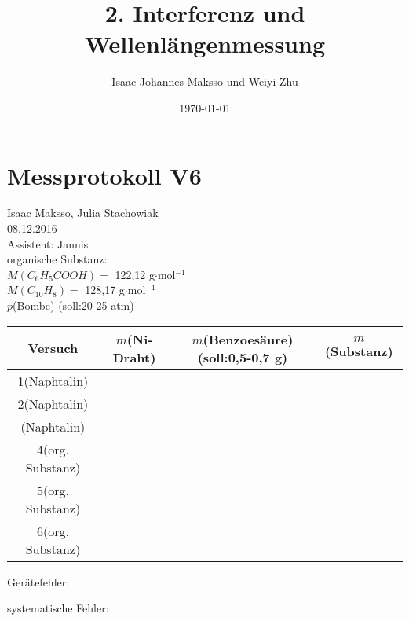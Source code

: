 \documentclass[a4paper,12pt,oneside,onecolum,final,openany]{report}
\title{2. Interferenz und Wellenlängenmessung}
\author{Isaac-Johannes Maksso und Weiyi Zhu}
\date{\today}
\begin{document}
\section*{Messprotokoll V6}

Isaac Maksso, Julia Stachowiak\\
08.12.2016\\
Assistent: Jannis\\

organische Substanz:\\
$M(C_6H_5COOH)=$ 122,12 g$\cdot$mol$^{-1}$\\
$M(C_{10}H_8)=$ 128,17 g$\cdot$mol$^{-1}$\\
$p$(Bombe) (soll:20-25 atm)\\


\begin{tabular}{|c|c|c|c|}
\hline 
Versuch & $m$(Ni-Draht) & $m$(Benzoesäure)(soll:0,5-0,7 g) & $m$ (Substanz) \\ 
\hline 
1(Naphtalin) &&& \\ 
\hline 
2(Naphtalin) &&& \\ 
\hline 
(Naphtalin)  &&& \\ 
\hline 
4(org. Substanz)  &&& \\ 
\hline 
5(org. Substanz)  &&& \\ 
\hline 
6(org. Substanz)  &&& \\ 
\hline 
\end{tabular} 

\vspace{4cm}

Gerätefehler:\\
\vspace{3cm}

systematische Fehler:\\
\noindent
\end{document}
